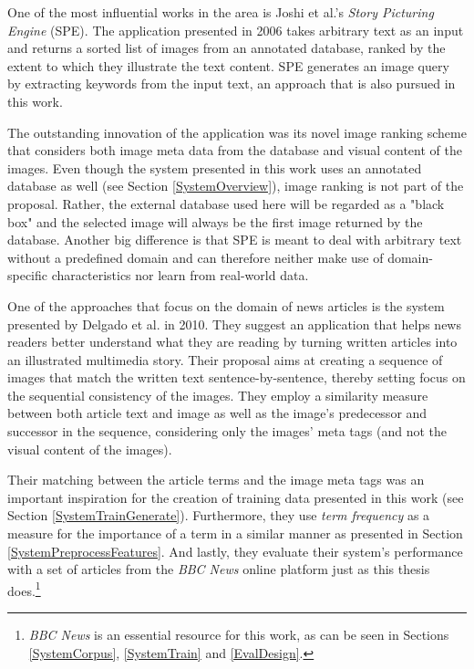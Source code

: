 \documentclass[11pt,a4paper,twoside]{article}
\begin{document}
\bigskip

One of the most influential works in the area is Joshi et al.'s \emph{Story Picturing Engine} (SPE). \cite{Joshi2006TheIllustration} The application presented in 2006 takes arbitrary text as an input and returns a sorted list of images from an annotated database, ranked by the extent to which they illustrate the text content. SPE generates an image query by extracting keywords from the input text, an approach that is also pursued in this work. 

The outstanding innovation of the application was its novel image ranking scheme that considers both image meta data from the database and visual content of the images. Even though the system presented in this work uses an annotated database as well (see Section \ref{SystemOverview}), image ranking is not part of the proposal. Rather, the external database used here will be regarded as a "black box" and the selected image will always be the first image returned by the database. Another big difference is that SPE is meant to deal with arbitrary text without a predefined domain and can therefore neither make use of domain-specific characteristics nor learn from real-world data.

\bigskip

One of the approaches that focus on the domain of news articles is the system presented by Delgado et al. in 2010. \cite{Delgado2010AutomatedExperience} They suggest an application that helps news readers better understand what they are reading by turning written articles into an illustrated multimedia story. Their proposal aims at creating a sequence of images that match the written text sentence-by-sentence, thereby setting focus on the sequential consistency of the images. They employ a similarity measure between both article text and image as well as the image's predecessor and successor in the sequence, considering only the images' meta tags (and not the visual content of the images). 

Their matching between the article terms and the image meta tags was an important inspiration for the creation of training data presented in this work (see Section \ref{SystemTrainGenerate}). Furthermore, they use \emph{term frequency} as a measure for the importance of a term in a similar manner as presented in Section \ref{SystemPreprocessFeatures}. And lastly, they evaluate their system's performance with a set of articles from the \emph{BBC News} online platform just as this thesis does.\footnote{\emph{BBC News} is an essential resource for this work, as can be seen in Sections \ref{SystemCorpus}, \ref{SystemTrain} and \ref{EvalDesign}.}
\end{document}
